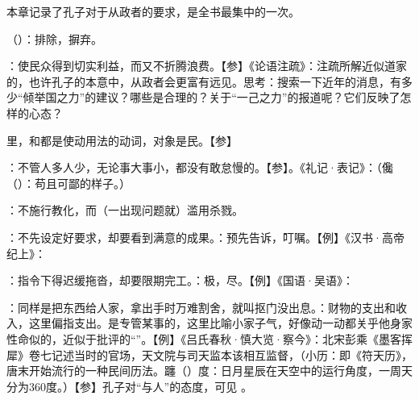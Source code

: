 {
本章记录了孔子对于从政者的要求，是全书最集中的一次。
\begin{lyitemize}
\item {}（）：排除，摒弃。
\item {}：使民众得到切实利益，而又不折腾浪费。【参】《论语注疏》：注疏所解近似道家的，也许孔子的本意中，从政者会更富有远见。思考：搜索一下近年的消息，有多少“倾举国之力”的建议？哪些是合理的？关于“一己之力”的报道呢？它们反映了怎样的心态？
\item {}里，和都是使动用法的动词，对象是民。【参】
\item {}：不管人多人少，无论事大事小，都没有敢怠慢的。【参】。《礼记·表记》：（儳（）：苟且可鄙的样子。）%
\item {}：不施行教化，而（一出现问题就）滥用杀戮。%
\item {}：不先设定好要求，却要看到满意的成果。：预先告诉，叮嘱。【例】《汉书·高帝纪上》：
\item {}：指令下得迟缓拖沓，却要限期完工。：极，尽。【例】《国语·吴语》：
\item {}：同样是把东西给人家，拿出手时万难割舍，就叫抠门没出息。：财物的支出和收入，这里偏指支出。是专管某事的，这里比喻小家子气，好像动一动都关乎他身家性命似的，近似于批评的“”。【例】《吕氏春秋·慎大览·察今》：北宋彭乘《墨客挥犀》卷七记述当时的官场，天文院与司天监本该相互监督，（小历：即《符天历》，唐末开始流行的一种民间历法。躔（）度：日月星辰在天空中的运行角度，一周天分为360度。）【参】孔子对“与人”的态度，可见  。

\end{lyitemize}}
